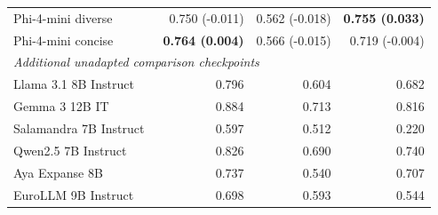 \begin{table}[t]
\begin{tabular}{lrrr}
Phi-4-mini diverse & 0.750 (-0.011) & 0.562 (-0.018) & \textbf{0.755 (0.033)}\\
Phi-4-mini concise & \textbf{0.764 (0.004)} & 0.566 (-0.015) & 0.719 (-0.004)\\
\midrule\multicolumn{4}{l}{\textit{Additional unadapted comparison checkpoints}}\\
Llama 3.1 8B Instruct~\cite{llama31card} & 0.796 & 0.604 & 0.682\\
Gemma 3 12B IT~\cite{gemma3card} & 0.884 & 0.713 & 0.816\\
Salamandra 7B Instruct~\cite{salamandracard} & 0.597 & 0.512 & 0.220\\
Qwen2.5 7B Instruct~\cite{qwen25report} & 0.826 & 0.690 & 0.740\\
Aya Expanse 8B~\cite{aya2024} & 0.737 & 0.540 & 0.707\\
EuroLLM 9B Instruct~\cite{eurollmcard} & 0.698 & 0.593 & 0.544\\
\bottomrule\end{tabular}\end{table}